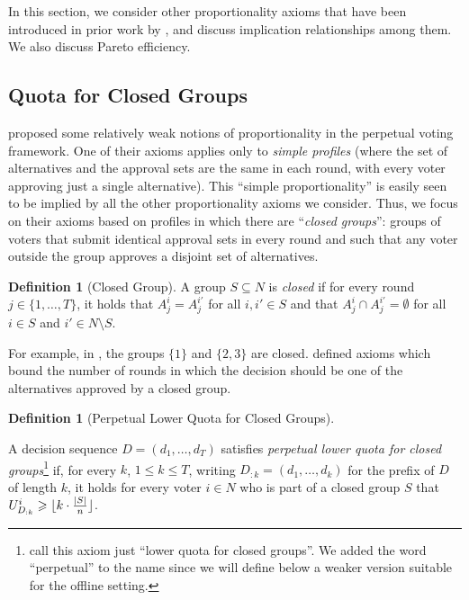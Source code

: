 \documentclass[10pt]{scrartcl}
\theoremstyle{plain}
\theoremstyle{definition}
\newtheorem{definition}[theorem]{Definition}
\renewcommand*{\le}{\leqslant}
\renewcommand*{\ge}{\geqslant}
\begin{document}
In this section, we consider other proportionality axioms that have been introduced in prior work by \citet{lacknermaly2023}, and discuss implication relationships among them. We also discuss Pareto efficiency.




\subsection{Quota for Closed Groups}
\label{app:closed-groups}


\citet{lacknermaly2023} proposed some relatively weak notions of proportionality in the perpetual voting framework. One of their axioms applies only to \emph{simple profiles} (where the set of alternatives and the approval sets are the same in each round, with every voter approving just a single alternative). This ``simple proportionality'' is easily seen to be implied by all the other proportionality axioms we consider. Thus, we focus on their axioms based on profiles in which there are ``\emph{closed groups}'': groups of voters that submit identical approval sets in every round and such that any voter outside the group approves a disjoint set of alternatives.

\begin{definition}[Closed Group]
\label{def:closed_group}
    A group $S \subseteq N$ is \emph{closed} if for every round $j \in\{1, \ldots, T\}$, it holds that $A^i_j = A^{i'}_j$ for all $i, i' \in S$ and that $A^i_j \cap A^{i'}_j = \emptyset$ for all $i \in S$ and $i' \in N \setminus S$.
\end{definition}
\vspace{-6pt}
For example, in , the groups $\{1\}$ and $\{2, 3\}$ are closed. 
\citet{lacknermaly2023} defined axioms which bound the number of rounds in which the decision should be one of the alternatives approved by a closed group.

\begin{definition}[Perpetual Lower Quota for Closed Groups]
\label{def:plqc}

A decision sequence $D = (d_1, \dots, d_T)$ satisfies \emph{perpetual lower quota for closed groups}\footnote{\citet{lacknermaly2023} call this axiom just ``lower quota for closed groups''. We added the word ``perpetual'' to the name since we will define below a weaker version suitable for the offline setting.} if, for every $k$, $1 \le k \le T$, writing $D_{:k} = (d_1, \dots, d_k)$ for  the prefix of $D$ of length $k$, it holds for every voter $i \in N$ who is part of a closed group $S$ that $U^i_{D_{:k}} \ge \lfloor k \cdot \smash{\frac{\left|S\right|}{n}} \rfloor$.
\end{definition}
\end{document}
